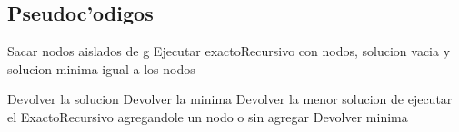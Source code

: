 \subsection{Pseudoc'odigos}

\begin{algorithmic}[1]
\STATE Sacar nodos aislados de g 
\STATE Ejecutar exactoRecursivo con nodos, solucion vacia y solucion minima igual a los nodos  
\end{algorithmic}


\begin{algorithmic}[1]
		\STATE Devolver la solucion
	\ELSE
		\STATE Devolver la minima
	\ENDIF
{}
	\STATE Devolver la menor solucion de ejecutar el ExactoRecursivo agregandole un nodo o sin agregar
\ELSE
	\STATE Devolver minima
\ENDIF
\end{algorithmic}
